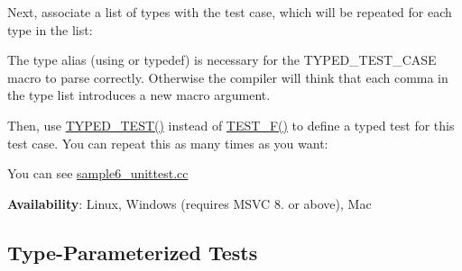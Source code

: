 Next, associate a list of types with the test case, which will be repeated for each type in the list\+:


\begin{DoxyCode}{0}
\end{DoxyCode}


The type alias ({\ttfamily using} or {\ttfamily typedef}) is necessary for the {\ttfamily T\+Y\+P\+E\+D\+\_\+\+T\+E\+S\+T\+\_\+\+C\+A\+SE} macro to parse correctly. Otherwise the compiler will think that each comma in the type list introduces a new macro argument.

Then, use {\ttfamily \mbox{\hyperlink{googletest-list-tests-unittest___8cc_a83ec84c5fac9fdffa59a16e5d043bd66}{T\+Y\+P\+E\+D\+\_\+\+T\+E\+S\+T()}}} instead of {\ttfamily \mbox{\hyperlink{gtest_8h_a0ee66d464d1a06c20c1929cae09d8758}{T\+E\+S\+T\+\_\+\+F()}}} to define a typed test for this test case. You can repeat this as many times as you want\+:


\begin{DoxyCode}{0}
\DoxyCodeLine{}
\DoxyCodeLine{}
\DoxyCodeLine{}
\DoxyCodeLine{\}}
\DoxyCodeLine{}
\end{DoxyCode}


You can see \mbox{\hyperlink{sample6__unittest_8cc}{sample6\+\_\+unittest.\+cc}}

{\bfseries{Availability}}\+: Linux, Windows (requires M\+S\+VC 8. or above), Mac

\subsection*{Type-\/\+Parameterized Tests}

